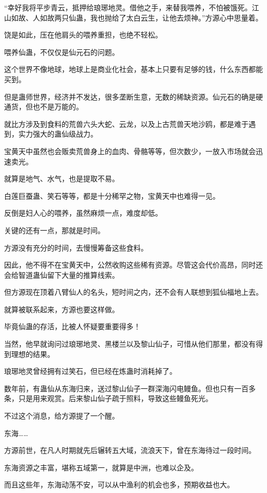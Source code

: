\begin{this_body}
“幸好我将平步青云，抵押给琅琊地灵。借他之手，来替我喂养，不怕被饿死。江山如故、人如故两只仙蛊，我也抛给了太白云生，让他去烦神。”方源心中思量着。

饶是如此，压在他肩头的喂养重担，也绝不轻松。

喂养仙蛊，不仅仅是仙元石的问题。

这个世界不像地球，地球上是商业化社会，基本上只要有足够的钱，什么东西都能买到。

但是蛊师世界，经济并不发达，很多垄断生意，无数的稀缺资源。仙元石的确是硬通货，但也不是万能的。

就比方涉及到食料的荒兽六头大蛇、云龙，以及上古荒兽天地沙鸥，都是难于遇到，实力强大的蛊仙级战力。

宝黄天中虽然也会贩卖荒兽身上的血肉、骨骼等等，但次数少，一放入市场就会迅速卖光。

就算是地气、水气，也是提取不易。

白莲巨蚕蛊、笑石等等，都是十分稀罕之物，宝黄天中也难得一见。

反倒是妇人心的喂养，虽然麻烦一点，难度却低。

关键的还有一点，那就是时间。

方源没有充分的时间，去慢慢筹备这些食料。

因此，他不得不在宝黄天中，公然收购这些稀有资源。尽管这会代价高昂，同时还会给智道蛊仙留下大量的推算线索。

但方源现在顶着八臂仙人的名头，短时间之内，还不会有人联想到狐仙福地上去。

就算被联系起来，方源也要这样做。

毕竟仙蛊的存活，比被人怀疑要重要得多！

当然，他早就询问过琅琊地灵、黑楼兰以及黎山仙子，可惜从他们那里，都没有得到理想的结果。

琅琊地灵曾经拥有过笑石，但已经在炼蛊时消耗掉了。

数年前，有蛊仙从东海归来，送过黎山仙子一群深海闪电鳗鱼。但也只有一百多条，只是用来观赏。后来黎山仙子疏于照料，导致这些鳗鱼死光。

不过这个消息，给方源提了一个醒。

东海……

方源前世，在凡人时期就先后辗转五大域，流浪天下，曾在东海待过一段时间。

东海资源之丰富，堪称五域第一，就算是中洲，也难以企及。

而且这些年，东海动荡不安，可以从中渔利的机会也多，预期收益也大。


\end{this_body}
